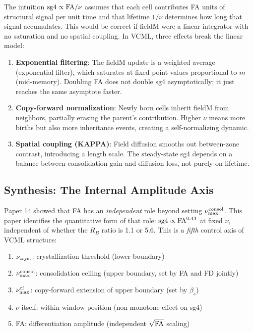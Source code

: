\documentclass[11pt]{article}
\begin{document}
The intuition ${\rm sg4} \propto {\rm FA}/\nu$ assumes that each cell
contributes FA units of structural signal per unit time and that lifetime
$1/\nu$ determines how long that signal accumulates.
This would be correct if fieldM were a linear integrator with no
saturation and no spatial coupling.
In VCML, three effects break the linear model:
\begin{enumerate}
\item \textbf{Exponential filtering}: The fieldM update is a weighted
average (exponential filter), which saturates at fixed-point values
proportional to $m$ (mid-memory). Doubling FA does not double sg4
asymptotically; it just reaches the same asymptote faster.
\item \textbf{Copy-forward normalization}: Newly born cells inherit fieldM
from neighbors, partially erasing the parent's contribution. Higher $\nu$
means more births but also more inheritance events, creating a
self-normalizing dynamic.
\item \textbf{Spatial coupling (KAPPA)}: Field diffusion smooths out
between-zone contrast, introducing a length scale. The steady-state sg4
depends on a balance between consolidation gain and diffusion loss, not
purely on lifetime.
\end{enumerate}

\subsection{Synthesis: The Internal Amplitude Axis}

Paper 14 showed that FA has an \emph{independent} role beyond setting
$\nu_{\rm max}^{\rm consol}$.
This paper identifies the quantitative form of that role:
${\rm sg4} \propto {\rm FA}^{0.43}$ at fixed $\nu$, independent of
whether the $R_B$ ratio is 1.1 or 5.6.
This is a \emph{fifth} control axis of VCML structure:
\begin{enumerate}
\item $\nu_{\rm cryst}$: crystallization threshold (lower boundary)
\item $\nu_{\rm max}^{\rm consol}$: consolidation ceiling (upper boundary,
set by FA and FD jointly)
\item $\nu_{\rm max}^{\rm cf}$: copy-forward extension of upper boundary
(set by $\beta_s$)
\item $\nu$ itself: within-window position (non-monotone effect on sg4)
\item FA: differentiation amplitude (independent $\sqrt{{\rm FA}}$ scaling)
\end{enumerate}
\end{document}
